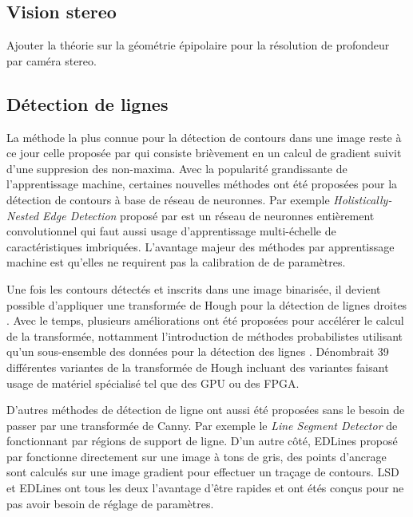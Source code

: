 \subsection{Vision stereo}
\color{red}
Ajouter la théorie sur la géométrie épipolaire pour la résolution de profondeur par caméra stereo.
\color{black}

\subsection{Détection de lignes}

La méthode la plus connue pour la détection de contours dans une image reste à ce jour celle proposée par \cite{Canny1986} qui consiste brièvement en un calcul de gradient suivit d'une suppresion des non-maxima. Avec la popularité grandissante de l'apprentissage machine, certaines nouvelles méthodes ont été proposées pour la détection de contours à base de réseau de neuronnes. Par exemple \textit{Holistically-Nested Edge Detection} proposé par \cite{Xie2015} est un réseau de neuronnes entièrement convolutionnel qui faut aussi usage d'apprentissage multi-échelle de caractéristiques imbriquées. L'avantage majeur des méthodes par apprentissage machine est qu'elles ne requirent pas la calibration de de paramètres.

Une fois les contours détectés et inscrits dans une image binarisée, il devient possible d'appliquer une transformée de Hough pour la détection de lignes droites \citep{Duda:1972}. Avec le temps, plusieurs améliorations ont été proposées pour accélérer le calcul de la transformée, nottamment l'introduction de méthodes probabilistes utilisant qu'un sous-ensemble des données pour la détection des lignes \citep{Matas2000}. \citep{Herout2013} Dénombrait 39 différentes variantes de la transformée de Hough incluant des variantes faisant usage de matériel spécialisé tel que des GPU ou des FPGA.

D'autres méthodes de détection de ligne ont aussi été proposées sans le besoin de passer par une transformée de Canny. Par exemple le \textit{Line Segment Detector} de \citep{Gioi2012lsd} fonctionnant par régions de support de ligne. D'un autre côté, EDLines proposé par \citep{AKINLAR20111633} fonctionne directement sur une image à tons de gris, des points d'ancrage sont calculés sur une image gradient pour effectuer un traçage de contours. LSD et EDLines ont tous les deux l'avantage d'être rapides et ont étés conçus pour ne pas avoir besoin de réglage de paramètres.
